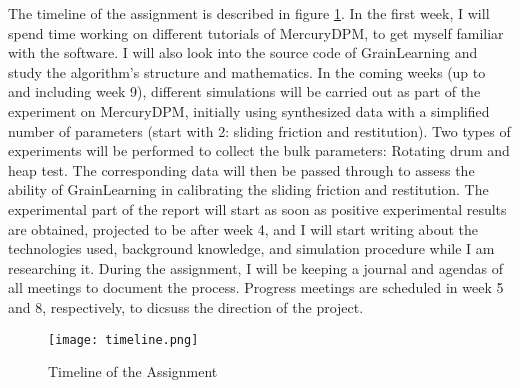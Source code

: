 \documentclass[../BachelorAssignment.tex]{subfiles}
\begin{document}
\graphicspath{{\subfix{../Images/}}}


The timeline of the assignment is described in figure \ref{fig:timeline}. In the first week, I will spend time working on different tutorials of MercuryDPM, to get myself familiar with the software. I will also look into the source code of GrainLearning and study the algorithm's structure and mathematics. In the coming weeks (up to and including week 9), different simulations will be carried out as part of the experiment on MercuryDPM, initially using synthesized data with a simplified number of parameters (start with 2: sliding friction and restitution). Two types of experiments will be performed to collect the bulk parameters: Rotating drum and heap test. The corresponding data will then be passed through to assess the ability of GrainLearning in calibrating the sliding friction and restitution. The experimental part of the report will start as soon as positive experimental results are obtained, projected to be after week 4, and I will start writing about the technologies used, background knowledge, and simulation procedure while I am researching it. During the assignment, I will be keeping a journal and agendas of all meetings to document the process. Progress meetings are scheduled in week 5 and 8, respectively, to dicsuss the direction of the project.

\begin{figure}[H]
    \centering
    \texttt{[image: timeline.png]}
    \caption{Timeline of the Assignment}
    \label{fig:timeline}
\end{figure}
\end{document}
